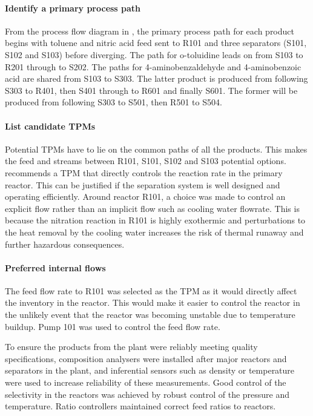 \paragraph{Identify a primary process path}
From the process flow diagram in , the primary process path for each product begins with toluene and nitric acid feed sent to R101 and three separators (S101, S102 and S103) before diverging. The path for o-toluidine leads on from S103 to R201 through to S202. The paths for 4-aminobenzaldehyde and 4-aminobenzoic acid are shared from S103 to S303. The latter product is produced from following S303 to R401, then S401 through to R601 and finally S601. The former will be produced from following S303 to S501, then R501 to S504.  

\paragraph{List candidate TPMs}
Potential TPMs have to lie on the common paths of all the products. This makes the feed and streams between R101, S101, S102 and S103 potential options. \textcite{} recommends a TPM that directly controls the reaction rate in the primary reactor. This can be justified if the separation system is well designed and operating efficiently. Around reactor R101, a choice was made to control an explicit flow rather than an implicit flow such as cooling water flowrate. This is because the nitration reaction in R101 is highly exothermic and perturbations to the heat removal by the cooling water increases the risk of thermal runaway and further hazardous consequences. 

\paragraph{Preferred internal flows}
The feed flow rate to R101 was selected as the TPM as it would directly affect the inventory in the reactor. This would make it easier to control the reactor in the unlikely event that the reactor was becoming unstable due to temperature buildup. Pump 101 was used to control the feed flow rate.

To ensure the products from the plant were reliably meeting quality specifications, composition analysers were installed after major reactors and separators in the plant, and inferential sensors such as density or temperature were used to increase reliability of these measurements. Good control of the selectivity in the reactors was achieved by robust control of the pressure and temperature. Ratio controllers maintained correct feed ratios to reactors.

